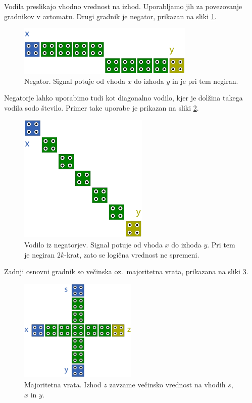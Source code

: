 \documentclass[a4paper, 11pt]{article}
\begin{document}
Vodila preslikajo vhodno vrednost na izhod.
Uporabljamo jih za povezovanje gradnikov v avtomatu.
Drugi gradnik je negator, prikazan na sliki \ref{img-pregled-negator}.

\begin{figure}[h]
	\centering
	\includegraphics[width=0.75\textwidth]{../img/pregled/negator.pdf}
	\caption{Negator. Signal potuje od vhoda $x$ do izhoda $y$ in je pri tem negiran.}
	\label{img-pregled-negator}
\end{figure}

Negatorje lahko uporabimo tudi kot diagonalno vodilo, kjer je dolžina takega vodila sodo število.
Primer take uporabe je prikazan na sliki \ref{img-pregled-negbus}.

\begin{figure}[h]
	\centering
	\includegraphics[width=0.55\textwidth]{../img/pregled/negbus.pdf}
	\caption{Vodilo iz negatorjev. Signal potuje od vhoda $x$ do izhoda $y$. Pri tem je negiran $2k$-krat, zato se logična vrednost ne spremeni.}
	\label{img-pregled-negbus}
\end{figure}

Zadnji osnovni gradnik so večinska oz.~majoritetna vrata, prikazana na sliki \ref{img-pregled-major}.

\begin{figure}[h]
	\centering
	\includegraphics[width=0.50\textwidth]{../img/pregled/major.pdf}
	\caption{Majoritetna vrata. Izhod $z$ zavzame večinsko vrednost na vhodih $s$, $x$ in $y$.}
	\label{img-pregled-major}
\end{figure}
\end{document}
